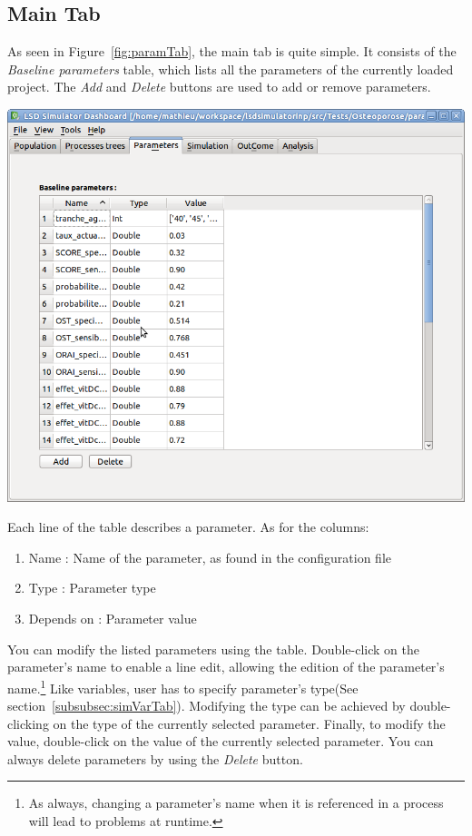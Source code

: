 \documentclass[a4paper,11pt]{report}
\begin{document}
\subsection{Main Tab}
As seen in Figure~\ref{fig:paramTab}, the main tab is quite simple. It consists of the \emph{Baseline parameters} table, which lists all the parameters of the currently loaded project. The \emph{Add} and \emph{Delete} buttons are used to add or remove parameters.

\begin{center}
\includegraphics[scale=0.3]{Pictures/Parameters/ParametersTab.png}
\label{fig:paramTab}
\end{center}
Each line of the table describes a parameter. As for the columns:
\begin{enumerate}
\item{Name : } Name of the parameter, as found in the configuration file
\item{Type : } Parameter type
\item{Depends on : } Parameter value
\end{enumerate}
You can modify the listed parameters using the table. Double-click on the parameter's name to enable a line edit, allowing the edition of the parameter's name.\footnote{As always, changing a parameter's name when it is referenced in a process will lead to problems at runtime.}  Like variables, user has to specify parameter's type(See section~\ref{subsubsec:simVarTab}). Modifying the type can be achieved by double-clicking on the type of the currently selected parameter. Finally, to modify the value, double-click on the value of the currently selected parameter.
You can always delete parameters by using the \emph{Delete} button.
\end{document}
